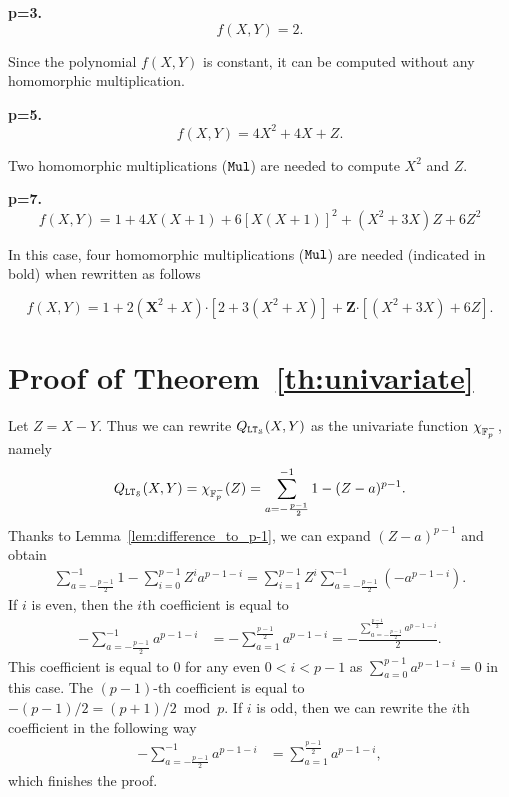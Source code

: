 \textbf{p=3.}
$$f(X,Y) = 2.$$

Since the polynomial $f(X,Y)$ is constant, it can be computed without any homomorphic multiplication.

\textbf{p=5.}
$$f(X,Y) = 4X^2 + 4X + Z.$$

Two homomorphic multiplications (${\mathtt{Mul}}$) are needed to compute $X^2$ and $Z$.

\textbf{p=7.}
$$f(X,Y) = 1 + 4X(X+1) + 6[X(X+1)]^2 + (X^2+3X)Z + 6Z^2$$

In this case, four homomorphic multiplications (${\mathtt{Mul}}$) are needed (indicated in bold) when rewritten as follows

$$f(X,Y) = 1 + 2(\bm{X}^2+X)\bm{\cdot}[2 + 3(X^2+X)] + \bm{Z}\bm{\cdot}[(X^2+3X) + 6Z].$$

\section{Proof of Theorem~\ref{th:univariate}}
\label{app:proof-lem-univariate}
   Let $Z = X-Y$.
    Thus we can rewrite $Q_{\mathtt{LT}_{\mathcal{S}}}(X,Y)$ as the univariate function $\chi_{\mathbb{F}_p^-}$, namely
    \begin{align*}
      Q_{\mathtt{LT}_{\mathcal{S}}}(X,Y) = \chi_{\mathbb{F}_p^-}(Z) = \sum_{a=-\frac{p-1}{2}}^{-1} 1 - (Z - a)^{p-1}.
    \end{align*}
    Thanks to Lemma~\ref{lem:difference_to_p-1}, we can expand $(Z-a)^{p-1}$ and obtain
    \begin{align*}
      \sum_{a=-\frac{p-1}{2}}^{-1} 1 - \sum_{i=0}^{p-1} Z^i a^{p-1-i}
      = \sum_{i=1}^{p-1} Z^i \sum_{a=-\frac{p-1}{2}}^{-1} (-a^{p-1-i}).
    \end{align*}
    If $i$ is even, then the $i$th coefficient is equal to
    \begin{align*}
      -\sum_{a=-\frac{p-1}{2}}^{-1} a^{p-1-i} &= -\sum_{a=1}^{\frac{p-1}{2}} a^{p-1-i} = -\frac{\sum_{a=-\frac{p-1}{2}}^{\frac{p-1}{2}} a^{p-1-i}}{2}.
    \end{align*}
    This coefficient is equal to $0$ for any even $0<i < p-1$ as $\sum_{a=0}^{p-1} a^{p-1-i} = 0$ in this case.
    The $(p-1)$-th coefficient is equal to $-(p-1)/2 = (p+1)/2 \bmod p$.
    If $i$ is odd, then we can rewrite the $i$th coefficient in the following way
    \begin{align*}
      -\sum_{a=-\frac{p-1}{2}}^{-1} a^{p-1-i} &= \sum_{a=1}^{\frac{p-1}{2}} a^{p-1-i},
    \end{align*}
    which finishes the proof.
 

